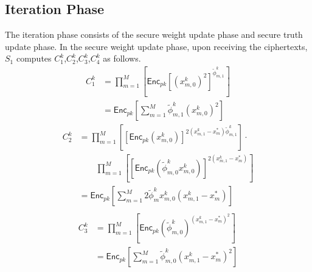 \documentclass[conference]{IEEEtran}
\begin{document}
\subsection{Iteration Phase}
The iteration phase consists of the secure weight update phase and secure truth update phase.
In the secure weight update phase, 
upon receiving the ciphertexts, $S_1$ computes $C_1^k$,$C_2^k$,$C_3^k$,$C_4^k$ as follows.
\begin{equation}
  \begin{split}
  C_1^k & = \prod_{m=1}^M\left[ \mathsf{Enc}_{pk}{\left[\left(x_{m,0}^k\right)^2\right]}^{\tilde{\phi}_{m,1}^k} \right] \\
  & = \mathsf{Enc}_{pk}\left[ \sum_{m=1}^M \tilde{\phi}_{m,1}^k \left(x_{m,0}^k\right)^2\right]
  \end{split}
\end{equation}
\begin{equation}
  \begin{split}
  C_2^k & =  \prod_{m=1}^M\left[ \left[\mathsf{Enc}_{pk}\left(x_{m,0}^k\right)\right]^{2\left(x_{m,1}^k - x_m^*\right)\tilde{\phi}_{m,1}^k}\right] \cdot \\
          & \qquad \prod_{m=1}^M\left[ \left[\mathsf{Enc}_{pk}\left(\tilde{\phi}_{m,0}^k x_{m,0}^k\right)\right]^{2\left(x_{m,1}^k - x_m^*\right)} \right] \\
          & = \mathsf{Enc}_{pk}\left[\sum_{m=1}^M 2\tilde{\phi}_m^k x_{m,0}^k\left(x_{m,1}^k - x_m^*\right)\right]  \\
  \end{split}
\end{equation}
\begin{equation}
  \begin{split}
    C_3^k & = \prod_{m=1}^M\left[ \mathsf{Enc}_{pk}\left(\tilde{\phi}_{m,0}^k\right)^{\left(x_{m,1}^k - x_m^*\right)^2} \right] \\
    & = \mathsf{Enc}_{pk}\left[\sum_{m=1}^M \tilde{\phi}_{m,0}^k\left(x_{m,1}^k - x_m^*\right)^2\right] \\
  \end{split}
\end{equation}
\end{document}

